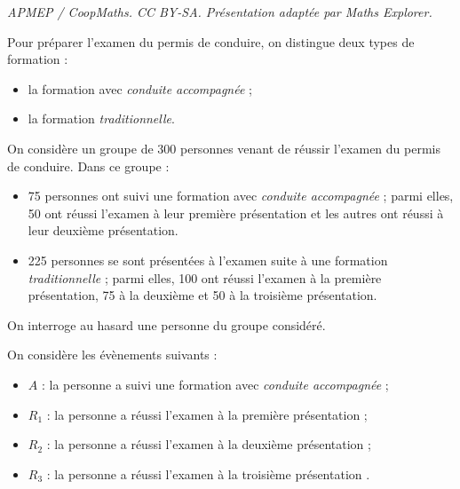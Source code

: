 \documentclass[10pt]{article}
\begin{document}
\noindent\textit{APMEP / CoopMaths. CC BY-SA. Présentation adaptée par Maths Explorer.}\par\medskip
\medskip

Pour préparer l'examen du permis de conduire, on distingue deux types de formation :

\begin{itemize}
\item la formation avec \emph{conduite accompagnée} ;
\item la formation \emph{traditionnelle}.
\end{itemize}

On considère un groupe de 300 personnes venant de réussir l'examen du permis de conduire. Dans ce groupe :

\begin{itemize}
\item 75 personnes ont suivi une formation avec \emph{conduite accompagnée} ; parmi elles, 50 ont réussi l'examen à leur première présentation et les autres ont réussi à leur deuxième présentation.
\item  225 personnes se sont présentées à l'examen suite à une formation \emph{traditionnelle} ; parmi elles, 100 ont réussi l'examen à la première présentation, 75 à la deuxième et 50 à la troisième présentation.
\end{itemize}

On interroge au hasard une personne du groupe considéré.

On considère les évènements suivants :
\begin{itemize}
\item [] $A$ : \og la personne a suivi une formation avec \emph{conduite accompagnée} \fg{} ;
\item [] $R_1$ : \og la personne a réussi l'examen à la première présentation \fg{} ;
\item []$R_2$ : \og la personne a réussi l'examen à la deuxième présentation \fg{} ;
\item []$R_3$ : \og la personne a réussi l'examen à la troisième présentation \fg.
\end{itemize}

\medskip
\end{document}
